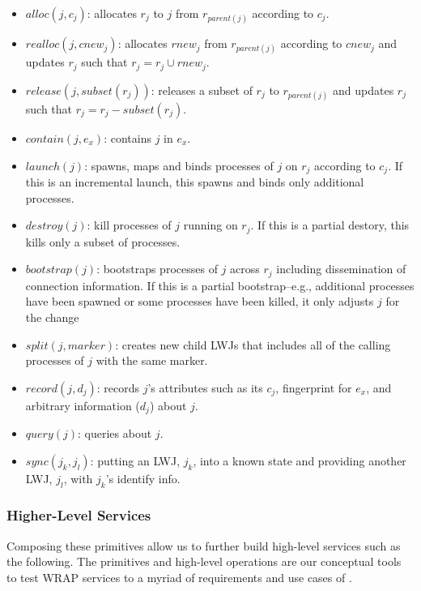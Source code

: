 \begin{itemize}

\item{$alloc(j, c_j)$: allocates $r_j$ to $j$ from $r_{parent(j)}$ according to $c_j$.}

\item{$realloc(j, cnew_j)$: allocates $rnew_j$ from $r_{parent(j)}$ according to $cnew_j$ and updates $r_j$ such that $r_j = r_j \cup rnew_j$.}

\item{$release(j, subset(r_j))$: releases a subset of $r_j$ to $r_{parent(j)}$ and updates $r_j$ such that $r_j = r_j - subset(r_j)$.}

\item{$contain(j, e_x)$: contains $j$ in $e_x$.}

\item{$launch(j)$: spawns, maps and binds processes of $j$ on $r_j$ according to $c_j$. If this is an incremental launch, this spawns and binds only additional processes.}

\item{$destroy(j)$: kill processes of $j$ running on $r_j$. If this is a partial destory, this kills only a subset of processes.}

\item{$bootstrap(j)$: bootstraps processes of $j$ across $r_j$ including dissemination of connection information. If this is a partial bootstrap--e.g., additional processes have been spawned or some processes have been killed, it only adjusts $j$ for the change}

\item{$split(j, marker)$: creates new child LWJs that includes all of the calling processes of $j$ with the same marker.}

\item{$record(j, d_j)$: records $j$'s attributes such as its $c_j$, fingerprint for $e_x$, and arbitrary information ($d_j$) about $j$.}

\item{$query(j)$: queries about $j$.}

\item{$sync(j_k, j_l)$: putting an LWJ, $j_k$, into a known state and providing another LWJ, $j_l$, with $j_k$'s identify info.}

\end{itemize}

\subsubsection{Higher-Level Services}
\label{sect:hiop}
Composing these primitives allow us to further build high-level services
such as the following. The primitives and high-level operations are our 
conceptual tools to test WRAP services to a myriad of requirements and use cases of \ngrm.

